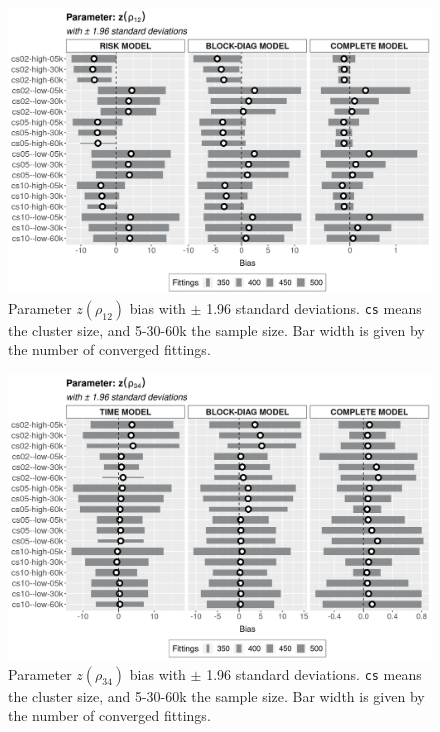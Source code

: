 \documentclass[a4paper,12pt]{article}
\begin{document}
\vspace{-0.514cm}
\begin{figure}[H]
 \centering
 \includegraphics[width=\linewidth]{pics/bias2plotsd-11.png}
 \vspace{-0.75cm}
 \caption{Parameter \(z(\rho_{12})\) bias with \(\pm\) 1.96 standard
   deviations. \texttt{cs} means the cluster size, and 5-30-60k the
   sample size. Bar width is given by the number of converged fittings.}
 \label{fig:biassdrhoz12}
\end{figure}

\begin{figure}[H]
 \centering
 \includegraphics[width=\linewidth]{pics/bias2plotsd-12.png}
 \vspace{-0.75cm}
 \caption{Parameter \(z(\rho_{34})\) bias with \(\pm\) 1.96 standard
   deviations. \texttt{cs} means the cluster size, and 5-30-60k the
   sample size. Bar width is given by the number of converged fittings.}
 \label{fig:biassdrhoz34}
\end{figure}
\end{document}
